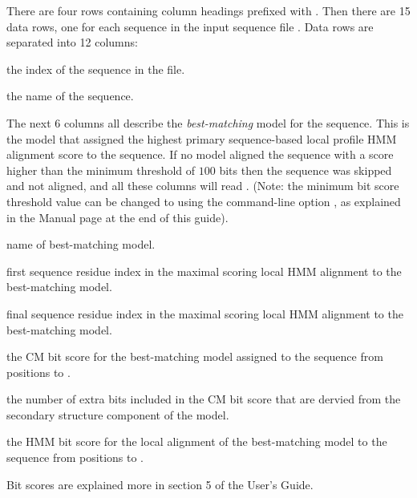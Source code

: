 There are four rows containing column headings prefixed with
\prog{\#}. Then there are 15 data rows, one for each sequence in the
input sequence file . Data rows are
separated into 12 columns:

\begin{wideitem}
\item[\emprog{idx}] the index of the sequence in the file.

\item[\emprog{sequence name}] the name of the sequence.
\end{wideitem}

The next 6 columns all describe the \emph{best-matching} model for the
sequence. This is the model that assigned the highest primary
sequence-based local profile HMM alignment score to the sequence.  If
no model aligned the sequence with a score higher than the minimum
threshold of $100$ bits then the
sequence was skipped and not aligned, and all these columns will read
\prog{-}. (Note: the minimum bit score threshold value can be changed
to  using the  command-line option , as explained in the Manual page at the end of this guide).

\begin{wideitem}
\item[\emprog{model name}] name of best-matching model.

\item[\emprog{beg}] first sequence residue index in the maximal
  scoring local HMM alignment to the best-matching model.

\item[\emprog{end}] final sequence residue index in the maximal
  scoring local HMM alignment to the best-matching model.

\item[\emprog{CM sc}] the CM bit score for the best-matching model
  assigned to the sequence from positions  to .

\item[\emprog{struct}] the number of extra bits included in the
  CM bit score that are dervied from the secondary structure component
  of the model.

\item[\emprog{HMM sc}] the HMM bit score for the local alignment of
  the best-matching model to the sequence from positions  to
  .
\end{wideitem}

Bit scores are explained more in section 5 of the 
User's Guide. 


